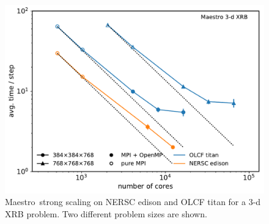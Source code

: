 \documentclass[letterpaper]{jpconf}
\newcommand{\maestro}{{\sffamily Maestro}}
\begin{document}
\begin{figure}[t]
\centering
\includegraphics[width=0.48\linewidth]{titan_edison_maestro_scaling}
\begin{minipage}[b]{0.48\linewidth}
\caption{\label{fig:maestro_scaling} \maestro\ strong scaling on NERSC
  edison and OLCF titan for a 3-d XRB problem.  Two different problem
  sizes are shown.\vspace{2em}}
\end{minipage}
\end{figure}
\end{document}
